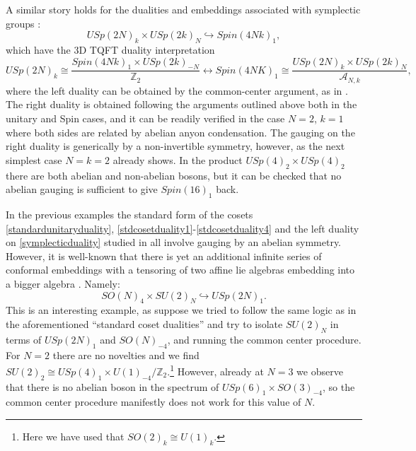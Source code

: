 \documentclass[11pt]{article}
\numberwithin{equation}{section}
\begin{document}
A similar story holds for the dualities and embeddings associated with symplectic groups \cite{Aharony:2016jvv}:
\begin{equation}
    USp(2N)_{k} \times USp(2k)_{N} \hookrightarrow Spin(4Nk)_{1}, 
\end{equation}
which have the 3D TQFT duality interpretation 
\begin{equation} \label{symplecticduality}
    USp(2N)_{k} \cong \frac{Spin(4Nk)_{1} \times USp(2k)_{-N}}{\mathbb{Z}_{2}} \longleftrightarrow Spin(4NK)_{1} \cong \frac{USp(2N)_{k} \times USp(2k)_{N}}{\mathcal{A}_{N,k}},
\end{equation}
where the left duality can be obtained by the common-center argument, as in \cite{Aharony:2016jvv}. The right duality is obtained following the arguments outlined above both in the unitary and Spin cases, and it can be readily verified in the case $N=2$, $k=1$ where both sides are related by abelian anyon condensation. The gauging on the right duality is generically by a non-invertible symmetry, however, as the next simplest case $N=k=2$ already shows. In the product $USp(4)_{2} \times USp(4)_{2}$ there are both abelian and non-abelian bosons, but it can be checked that no abelian gauging is sufficient to give $Spin(16)_{1}$ back.

In the previous examples the standard form of the cosets \eqref{standardunitaryduality}, \eqref{stdcosetduality1}-\eqref{stdcosetduality4} and the left duality on \eqref{symplecticduality} studied in \cite{Hsin:2016blu, Aharony:2016jvv, Cordova:2017vab} all involve gauging by an abelian symmetry. However, it is well-known that there is yet an additional infinite series of conformal embeddings with a tensoring of two affine lie algebras embedding into a bigger algebra \cite{davydov2013witt}. Namely:
\begin{equation} \label{additionalembedding}
    SO(N)_{4} \times SU(2)_{N} \hookrightarrow USp(2N)_{1}.
\end{equation}
This is an interesting example, as suppose we tried to follow the same logic as in the aforementioned ``standard coset dualities'' and try to isolate $SU(2)_{N}$ in terms of $USp(2N)_{1}$ and $SO(N)_{-4}$, and running the common center procedure. For $N=2$ there are no novelties and we find $SU(2)_{2} \cong USp(4)_{1} \times U(1)_{-4} / \mathbb{Z}_{2}$.\footnote{Here we have used that $SO(2)_{k} \cong U(1)_{k}$.} However, already at $N=3$ we observe that there is no abelian boson in the spectrum of $USp(6)_{1} \times SO(3)_{-4}$, so the common center procedure manifestly does not work for this value of $N$. 
\end{document}
